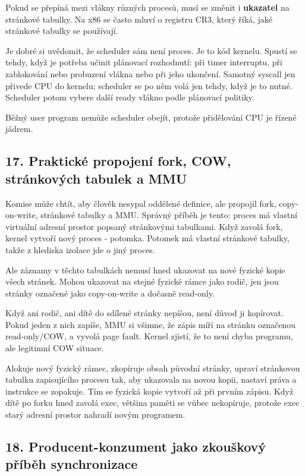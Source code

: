 \documentclass[11pt,a4paper]{article}
\begin{document}
Pokud se přepíná mezi vlákny různých procesů, musí se změnit i \textbf{ukazatel} na stránkové tabulky. Na x86 se často mluví o registru CR3, který říká, jaké stránkové tabulky se používají.

Je dobré si uvědomit, že scheduler sám není proces. Je to kód kernelu. Spustí se tehdy, když je potřeba učinit plánovací rozhodnutí: při timer interruptu, při zablokování nebo probuzení vlákna nebo při jeho ukončení. Samotný syscall jen přivede CPU do kernelu; scheduler se po něm volá jen tehdy, když je to nutné. Scheduler potom vybere další ready vlákno podle plánovací politiky.

Běžný user program nemůže scheduler obejít, protože přidělování CPU je řízené jádrem.

\subsection*{17. Praktické propojení fork, COW, stránkových tabulek a MMU}

Komise může chtít, aby člověk nesypal oddělené definice, ale propojil fork, copy-on-write, stránkové tabulky a MMU. Správný příběh je tento: proces má vlastní virtuální adresní prostor popsaný stránkovými tabulkami. Když zavolá fork, kernel vytvoří nový proces - potomka. Potomek má vlastní stránkové tabulky, takže z hlediska izolace jde o jiný proces.

Ale záznamy v těchto tabulkách nemusí hned ukazovat na nové fyzické kopie všech stránek. Mohou ukazovat na stejné fyzické rámce jako rodič, jen jsou stránky označené jako copy-on-write a dočasně read-only.

Když ani rodič, ani dítě do sdílené stránky nepíšou, není důvod ji kopírovat. Pokud jeden z nich zapíše, MMU si všimne, že zápis míří na stránku označenou read-only/COW, a vyvolá page fault. Kernel zjistí, že to není chyba programu, ale legitimní COW situace.

Alokuje nový fyzický rámec, zkopíruje obsah původní stránky, upraví stránkovou tabulku zapisujícího procesu tak, aby ukazovala na novou kopii, nastaví práva a instrukce se zopakuje. Tím se fyzická kopie vytvoří až při prvním zápisu. Když dítě po forku hned zavolá exec, většina paměti se vůbec nekopíruje, protože exec starý adresní prostor nahradí novým programem.

\subsection*{18. Producent-konzument jako zkouškový příběh synchronizace}
\end{document}
